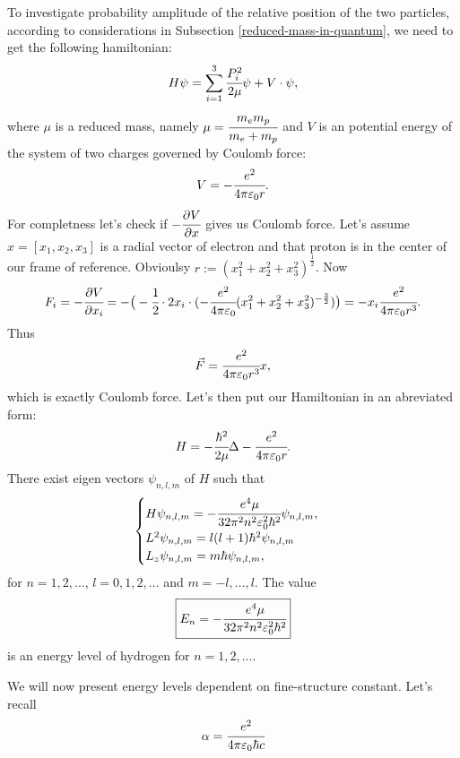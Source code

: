 \documentclass[main.tex]{subfiles}
\begin{document}
To investigate probability amplitude of the relative position of the two particles, according to considerations in Subsection \ref{reduced-mass-in-quantum}, we need to get the following hamiltonian:
\begin{equation}
H \psi = \sum_{i=1}^3 \cfrac{P^2_i}{2\mu}\psi + V\cdot\psi, 
\end{equation}
where $\mu$ is a reduced mass, namely $\mu = \cfrac{m_e m_p}{m_e + m_p}$ and $V$ is an potential energy of the system of two charges governed by Coulomb force:
\begin{equation}
V = - \cfrac{e^2}{4\pi\epsilon_0 r}.
\end{equation} 
For completness let's check if $-\cfrac{\partial V}{\partial x}$ gives us Coulomb force. Let's assume $x=[x_1, x_2, x_3]$ is a radial vector of electron and that proton is in the center of our frame of reference. Obvioulsy $r:=(x_1^2 + x_2^2 + x_3^2)^{\frac{1}{2}}$. Now
\begin{equation}
F_i = -\cfrac{\partial V}{\partial x_i} = -\big(-\cfrac{1}{2}\cdot 2x_i \cdot (-\cfrac{e^2}{4\pi\epsilon_0}(x_1^2 + x_2^2 + x_3^2)^{-\frac{3}{2}})\big) = -x_i \cfrac{e^2}{4\pi\epsilon_0 r^3}.
\end{equation}
Thus
\begin{equation}
\vec{F} = \cfrac{e^2}{4\pi\epsilon_0 r^3}x,
\end{equation}
which is exactly Coulomb force.
Let's then put our Hamiltonian in an abreviated form:
\begin{equation}
H = -\cfrac{\hbar^2}{2\mu}\Delta - \cfrac{e^2}{4\pi\epsilon_0 r}.
\end{equation}
There exist eigen vectors $\psi_{n,l,m}$ of $H$ such that
\begin{equation}
\begin{cases}
H\psi_{n,l,m} = -\cfrac{e^4 \mu }{32 \pi ^2 n^2 \epsilon_0^2 \hbar ^2}\psi_{n,l,m},\\
L^2 \psi_{n,l,m} = l(l+1)\hbar^2 \psi_{n,l,m}\\
L_z \psi_{n,l,m} = m\hbar \psi_{n,l,m},
\end{cases}
\end{equation}
for $n=1,2, \dots$, $l=0, 1, 2, \dots$ and $m=-l, \dots, l$.
The value
\begin{equation}
\boxed{
E_n = -\cfrac{e^4 \mu }{32 \pi ^2 n^2 \epsilon_0^2 \hbar ^2}
} 
\end{equation} 
is an energy level of hydrogen for $n=1,2,\dots$.

We will now present energy levels dependent on fine-structure constant. Let's recall
\begin{equation}
\alpha = \cfrac{e^2}{4\pi\epsilon_0\hbar c}
\end{equation}
\end{document}
